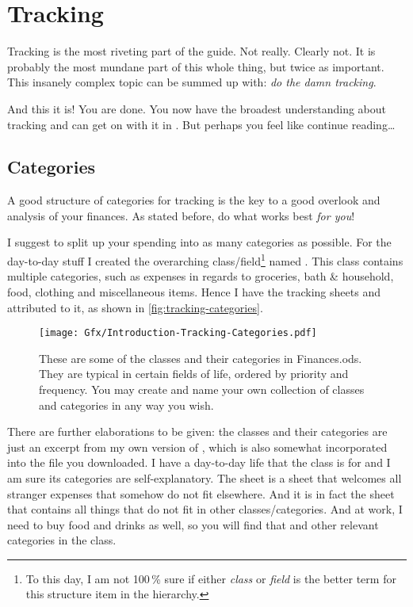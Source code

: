 \section{Tracking}
\label{sec:tracking}

Tracking is the most riveting part of the guide.
Not really.
Clearly not.
It is probably the most mundane part of this whole thing, but twice as important.
This insanely complex topic can be summed up with: \emph{do the damn tracking}.

And this it is!
You are done.
You now have the broadest understanding about tracking and can get on with it in \tfn.
But perhaps you feel like continue reading\ldots

\subsection{Categories}
\label{subsec:tracking-categories}

A good structure of categories for tracking is the key to a good overlook and analysis of your finances.
As stated before, do what works best \emph{for you}!

I suggest to split up your spending into as many categories as possible.
For the day-to-day stuff I created the overarching class/field\footnote{To this day, I am not 100\,\% sure if either \emph{class} or \emph{field} is the better term for this structure item in the hierarchy.} named .
This class contains multiple categories, such as expenses in regards to groceries, bath \& household, food, clothing and miscellaneous items.
Hence I have the tracking sheets  and  attributed to it, as shown in \autoref{fig:tracking-categories}.

\begin{figure}[htp]
	\centering
	\texttt{[image: Gfx/Introduction-Tracking-Categories.pdf]}
	\caption[Tracking Categories]{These are some of the classes and their categories in Finances.ods.
		They are typical in certain fields of life, ordered by priority and frequency.
		You may create and name your own collection of classes and categories in any way you wish.
	}
	\label{fig:tracking-categories}
\end{figure}

There are further elaborations to be given:
the classes and their categories are just an excerpt from my own version of \tfn, which is also somewhat incorporated into the file you downloaded.
I have a day-to-day life that the class  is for and I am sure its categories are self-explanatory.
The sheet  is a sheet that welcomes all stranger expenses that somehow do not fit elsewhere.
And it is in fact the sheet that contains all  things that do not fit in other classes/categories.
And at work, I need to buy food and drinks as well, so you will find that and other relevant categories in the  class.

